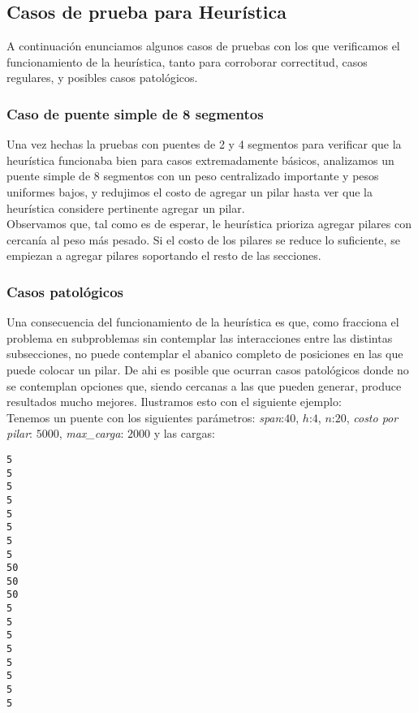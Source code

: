 \subsection{Casos de prueba para Heurística}

A continuación enunciamos algunos casos de pruebas con los que verificamos el funcionamiento de la heurística, tanto para corroborar correctitud, casos regulares, y posibles casos patológicos.

\subsubsection{Caso de puente simple de 8 segmentos}
Una vez hechas la pruebas con puentes de 2 y 4 segmentos para verificar que la heurística funcionaba bien para casos extremadamente básicos, analizamos un puente simple de 8 segmentos con un peso centralizado importante y pesos uniformes bajos, y redujimos el costo de agregar un pilar hasta ver que la heurística considere pertinente agregar un pilar.\\

Observamos que, tal como es de esperar, le heurística prioriza agregar pilares con cercanía al peso más pesado. Si el costo de los pilares se reduce lo suficiente, se empiezan a agregar pilares soportando el resto de las secciones.

\subsubsection{Casos patológicos}

Una consecuencia del funcionamiento de la heurística es que, como fracciona el problema en subproblemas sin contemplar las interacciones entre las distintas subsecciones, no puede contemplar el abanico completo de posiciones en las que puede colocar un pilar. De ahi es posible que ocurran casos patológicos donde no se contemplan opciones que, siendo cercanas a las que pueden generar, produce resultados mucho mejores. Ilustramos esto con el siguiente ejemplo:\\

Tenemos un puente con los siguientes parámetros: \textit{span}:$40$, $h$:$4$, $n$:$20$, \textit{costo por pilar}: $5000$, \textit{max\_carga}: $2000$ y las cargas:\\

\begin{verbatim}
5
5
5
5
5
5
5
5
50
50
50
5
5
5
5
5
5
5
5
\end{verbatim}

